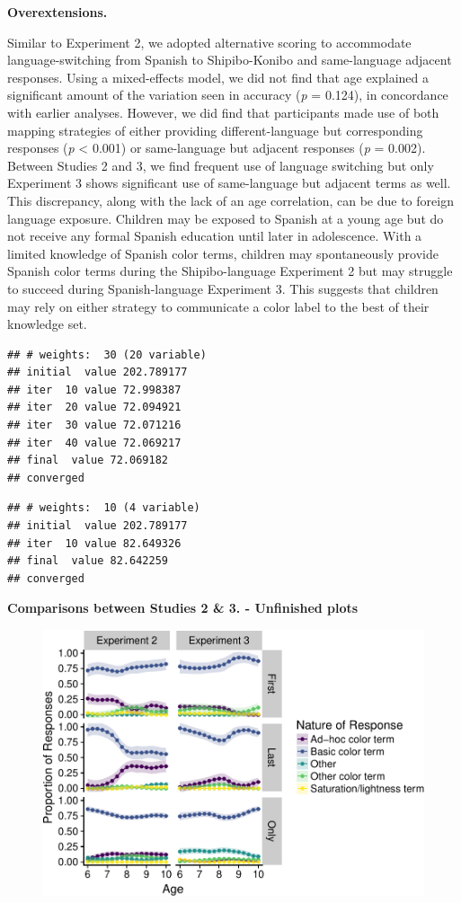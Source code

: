 \documentclass[floatsintext,man]{apa6}
\theoremstyle{definition}
\theoremstyle{definition}
\theoremstyle{definition}
\theoremstyle{remark}
\begin{document}
\textbf{Overextensions.}

Similar to Experiment 2, we adopted alternative scoring to accommodate
language-switching from Spanish to Shipibo-Konibo and same-language
adjacent responses. Using a mixed-effects model, we did not find that
age explained a significant amount of the variation seen in accuracy
(\emph{p} = 0.124), in concordance with earlier analyses. However, we
did find that participants made use of both mapping strategies of either
providing different-language but corresponding responses (\emph{p}
\textless{} 0.001) or same-language but adjacent responses (\emph{p} =
0.002). Between Studies 2 and 3, we find frequent use of language
switching but only Experiment 3 shows significant use of same-language
but adjacent terms as well. This discrepancy, along with the lack of an
age correlation, can be due to foreign language exposure. Children may
be exposed to Spanish at a young age but do not receive any formal
Spanish education until later in adolescence. With a limited knowledge
of Spanish color terms, children may spontaneously provide Spanish color
terms during the Shipibo-language Experiment 2 but may struggle to
succeed during Spanish-language Experiment 3. This suggests that
children may rely on either strategy to communicate a color label to the
best of their knowledge set.

\begin{verbatim}
## # weights:  30 (20 variable)
## initial  value 202.789177 
## iter  10 value 72.998387
## iter  20 value 72.094921
## iter  30 value 72.071216
## iter  40 value 72.069217
## final  value 72.069182 
## converged
\end{verbatim}

\begin{verbatim}
## # weights:  10 (4 variable)
## initial  value 202.789177 
## iter  10 value 82.649326
## final  value 82.642259 
## converged
\end{verbatim}

\textbf{Comparisons between Studies 2 \& 3. - Unfinished plots}

\begin{figure}
\centering
\includegraphics{amazon_color_files/figure-latex/crossstudy_accuracystrats-1.pdf}
\caption{}
\end{figure}
\end{document}
